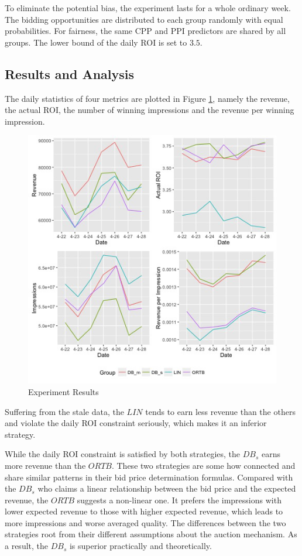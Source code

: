 \documentclass{article}
\begin{document}
To eliminate the potential bias, the experiment lasts for a whole ordinary week.
The bidding opportunities are distributed to each group randomly with equal probabilities.
For fairness, the same CPP and PPI predictors are shared by all groups.
The lower bound of the daily ROI is set to $3.5$.

\subsection{Results and Analysis}

The daily statistics of four metrics are plotted in Figure \ref{Result},
    namely the revenue, the actual ROI, the number of winning impressions and the revenue per winning impression.

\begin{figure}[!h]
\centering
\includegraphics[width=1.0\linewidth]{./Result.jpg}
\caption{Experiment Results\label{Result}}
\end{figure}

Suffering from the stale data, the $LIN$ tends to
    earn less revenue than the others and violate the daily ROI constraint seriously,
    which makes it an inferior strategy.

While the daily ROI constraint is satisfied by both strategies,
    the $DB_s$ earns more revenue than the $ORTB$.
These two strategies are some how connected and share similar patterns in their bid price determination formulas.
Compared with the $DB_s$ who claims a linear relationship between the bid price and the expected revenue,
    the $ORTB$ suggests a non-linear one.
It prefers the impressions with lower expected revenue to those with higher expected revenue,
    which leads to more impressions and worse averaged quality.
The differences between the two strategies root from their different assumptions about the auction mechanism.
As a result, the $DB_s$ is superior practically and theoretically.
\end{document}
